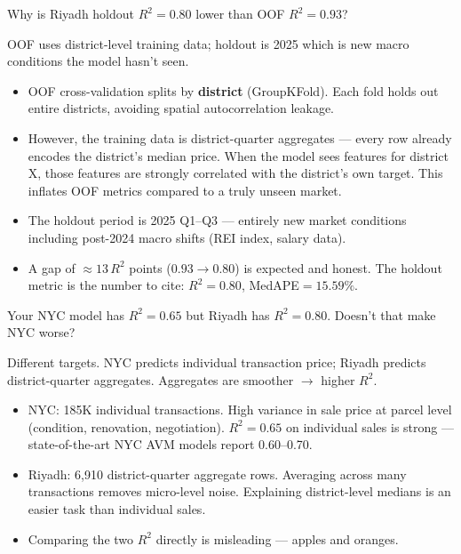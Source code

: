 \documentclass[11pt, a4paper, twoside]{article}
\begin{document}
\begin{question}{Why is Riyadh holdout $R^2=0.80$ lower than OOF $R^2=0.93$?}
\begin{shortanswer}
OOF uses district-level training data; holdout is 2025 which is new macro
conditions the model hasn't seen.
\end{shortanswer}

\begin{detail}
\begin{itemize}
  \item OOF cross-validation splits by \textbf{district} (GroupKFold). Each
        fold holds out entire districts, avoiding spatial autocorrelation
        leakage.
  \item However, the training data is district-quarter aggregates --- every row
        already encodes the district's median price. When the model sees
        features for district X, those features are strongly correlated with
        the district's own target. This inflates OOF metrics compared to a
        truly unseen market.
  \item The holdout period is 2025 Q1--Q3 --- entirely new market conditions
        including post-2024 macro shifts (REI index, salary data).
  \item A gap of $\approx 13\,R^2$ points ($0.93 \to 0.80$) is expected and
        honest. The holdout metric is the number to cite: $R^2=0.80$,
        MedAPE$=15.59\%$.
\end{itemize}
\end{detail}
\end{question}

\bigskip

\begin{question}{Your NYC model has $R^2=0.65$ but Riyadh has $R^2=0.80$.
                  Doesn't that make NYC worse?}
\begin{shortanswer}
Different targets. NYC predicts individual transaction price; Riyadh predicts
district-quarter aggregates. Aggregates are smoother $\to$ higher $R^2$.
\end{shortanswer}

\begin{detail}
\begin{itemize}
  \item NYC: 185K individual transactions. High variance in sale price at
        parcel level (condition, renovation, negotiation). $R^2=0.65$ on
        individual sales is strong --- state-of-the-art NYC AVM models report
        0.60--0.70.
  \item Riyadh: 6,910 district-quarter aggregate rows. Averaging across many
        transactions removes micro-level noise. Explaining district-level
        medians is an easier task than individual sales.
  \item Comparing the two $R^2$ directly is misleading --- apples and oranges.
\end{itemize}
\end{detail}
\end{question}
\end{document}

